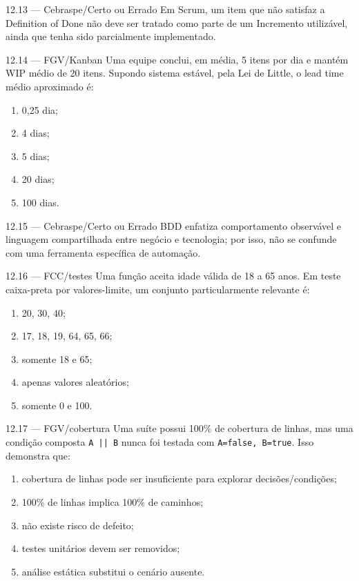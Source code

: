 \begin{questao}{ 12.13 — Cebraspe/Certo ou Errado}
Em Scrum, um item que não satisfaz a Definition of Done não deve ser tratado como parte de um Incremento utilizável, ainda que tenha sido parcialmente implementado.
\end{questao}

\begin{questao}{ 12.14 — FGV/Kanban}
Uma equipe conclui, em média, 5 itens por dia e mantém WIP médio de 20 itens. Supondo sistema estável, pela Lei de Little, o lead time médio aproximado é:
\begin{enumerate}[label=\Alph*)]
\item 0,25 dia;
\item 4 dias;
\item 5 dias;
\item 20 dias;
\item 100 dias.
\end{enumerate}
\end{questao}

\begin{questao}{ 12.15 — Cebraspe/Certo ou Errado}
BDD enfatiza comportamento observável e linguagem compartilhada entre negócio e tecnologia; por isso, não se confunde com uma ferramenta específica de automação.
\end{questao}

\begin{questao}{ 12.16 — FCC/testes}
Uma função aceita idade válida de 18 a 65 anos. Em teste caixa-preta por valores-limite, um conjunto particularmente relevante é:
\begin{enumerate}[label=\Alph*)]
\item 20, 30, 40;
\item 17, 18, 19, 64, 65, 66;
\item somente 18 e 65;
\item apenas valores aleatórios;
\item somente 0 e 100.
\end{enumerate}
\end{questao}

\begin{questao}{ 12.17 — FGV/cobertura}
Uma suíte possui 100\% de cobertura de linhas, mas uma condição composta \texttt{A || B} nunca foi testada com \texttt{A=false, B=true}. Isso demonstra que:
\begin{enumerate}[label=\Alph*)]
\item cobertura de linhas pode ser insuficiente para explorar decisões/condições;
\item 100\% de linhas implica 100\% de caminhos;
\item não existe risco de defeito;
\item testes unitários devem ser removidos;
\item análise estática substitui o cenário ausente.
\end{enumerate}
\end{questao}

